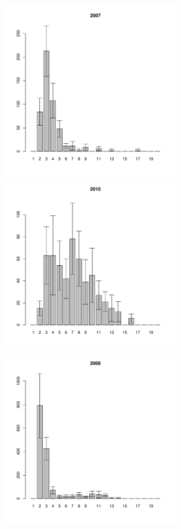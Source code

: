 \begin{figure}[hp]


	\begin{minipage}[b]{.46\linewidth}
	\begin{center}
	\includegraphics[width=65mm]{../White_Sea/Lomnishniy/Lomnishniy_2007_.pdf}
	\end{center}
	\end{minipage}
	\hfill
	\begin{minipage}[b]{.46\linewidth}
	\begin{center}
	\includegraphics[width=65mm]{../White_Sea/Lomnishniy/Lomnishniy_2010_.pdf}
	\end{center}
	\end{minipage}
%
	\begin{minipage}[b]{.46\linewidth}
	\begin{center}
	\includegraphics[width=65mm]{../White_Sea/Lomnishniy/Lomnishniy_2008_.pdf}

\end{center}
\end{minipage}
\end{figure}
